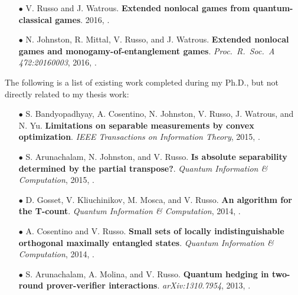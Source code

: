 \begin{itemize}

	\item[$\bullet$]
	V. Russo and J. Watrous.
	\textbf{Extended nonlocal games from quantum-classical games}. 2016,
	\cite{Russo2016}.

	\item[$\bullet$]
	N. Johnston, R. Mittal, V. Russo, and J. Watrous.
	\textbf{Extended nonlocal games and monogamy-of-entanglement games}. \textit{Proc.~R.~Soc.~A 472:20160003}, 2016,
	\cite{Johnston2015a}. 
			
\end{itemize}
The following is a list of existing work completed during my Ph.D., but not directly related to my thesis work:
\begin{itemize}

	\item[$\bullet$] 
	S. Bandyopadhyay, A. Cosentino, N. Johnston, V. Russo, J. Watrous, and N. Yu. 
	\textbf{Limitations on separable measurements by convex optimization}. 
	\textit{IEEE Transactions on Information Theory}, 2015,
	\cite{Bandyopadhyay2015}.
	
	\item[$\bullet$]
	S. Arunachalam, N. Johnston, and V. Russo.
	\textbf{Is absolute separability determined by the partial transpose?}. \textit{Quantum Information \& Computation}, 2015,
	\cite{Arunachalam2015}.

	\item[$\bullet$]
	D. Gosset, V. Kliuchinikov, M. Mosca, and V. Russo.
	\textbf{An algorithm for the T-count}. \textit{Quantum Information \& Computation}, 2014,
	\cite{Gosset2014}.
	
	\item[$\bullet$]
	A. Cosentino and V. Russo.
	\textbf{Small sets of locally indistinguishable orthogonal maximally entangled states}. 
	\textit{Quantum Information \& Computation},  2014,
	\cite{Cosentino2014}.

	\item[$\bullet$]
	S. Arunachalam, A. Molina, and V. Russo.
	\textbf{Quantum hedging in two-round prover-verifier interactions}. \textit{arXiv:1310.7954}, 2013,
	\cite{Arunachalam2013}.
	
\end{itemize}
